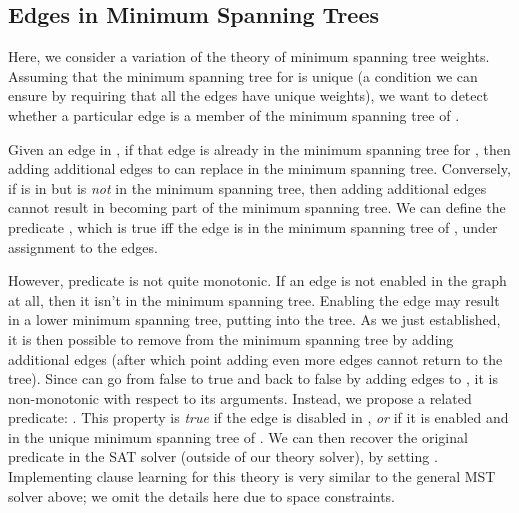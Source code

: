 \documentclass[runningheads]{llncs}
\begin{document}
\subsection{{Edges in Minimum Spanning Trees}}
Here, we consider a variation of the theory of minimum spanning tree weights.
Assuming that the minimum spanning tree for  is unique (a
condition we can ensure by requiring that all the edges have unique
weights), 
we want to detect whether a particular edge is a member of the minimum spanning tree of . 

Given an edge  in , if that edge is already in the minimum
spanning tree for , then adding additional edges to  can replace
 in the minimum spanning tree. Conversely, if  is in 
but is \textit{not} in the minimum spanning tree, then adding additional
edges cannot result in  becoming part of the minimum spanning
tree.
We can define the predicate ,
which is true iff the edge  is in the minimum spanning tree of , under assignment to the edges.

However, predicate  is not quite monotonic. If an edge is not enabled in the graph at all, then it isn't in the minimum spanning tree. Enabling the edge may result in a lower minimum spanning tree, putting  into the tree. As we just established, it is then possible to remove  from the minimum spanning tree by adding additional edges (after which point adding even more edges cannot return  to the tree). Since   can go from false to true and back to false by adding edges to , it is non-monotonic with respect to its arguments. Instead, we propose a related predicate: . This property is \textit{true} if the edge is disabled in , \textit{or} if it is enabled and in the unique minimum spanning tree of . We can then recover the original predicate in the SAT solver (outside of our theory solver), by setting . Implementing clause learning for this theory is very similar to the general MST solver above; we omit the details here due to space constraints.
\end{document}
